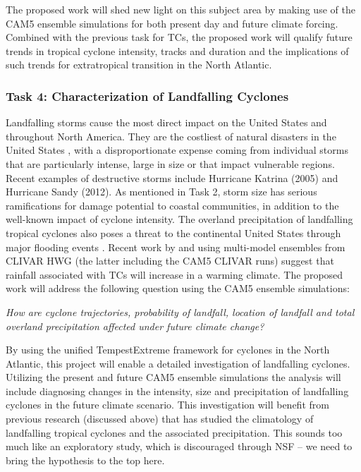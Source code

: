 \documentclass[11pt]{article}
\begin{document}
The proposed work will shed new light on this subject area by making use of the CAM5 ensemble simulations for both present day and future climate forcing. Combined with the previous task for TCs, the proposed work will qualify future trends in tropical cyclone intensity, tracks and duration and the implications of such trends for extratropical transition in the North Atlantic.

\subsubsection{Task 4: Characterization of Landfalling Cyclones}

Landfalling storms cause the most direct impact on the United States and throughout North America.  They are the costliest of natural disasters in the United States \citep{Pielke1998}, with a disproportionate expense coming from individual storms that are particularly intense, large in size or that impact vulnerable regions. Recent examples of destructive storms include Hurricane Katrina (2005) and Hurricane Sandy (2012). As mentioned in Task 2, storm size has serious ramifications for damage potential to coastal communities, in addition to the well-known impact of cyclone intensity.  The overland precipitation of landfalling tropical cyclones also poses a threat to the continental United States through major flooding events \citep{Villarini2014tcflooding}. Recent work by \citet{Scoccimarro2014} and \cite{Villarini2014} using multi-model ensembles from CLIVAR HWG (the latter including the CAM5 CLIVAR runs) suggest that rainfall associated with TCs will increase in a warming climate. The proposed work will address the following question using the CAM5 ensemble simulations:

\emph{How are cyclone trajectories, probability of landfall, location of landfall and total overland precipitation affected under future climate change?}

By using the unified TempestExtreme framework for cyclones in the North Atlantic, this project will enable a detailed investigation of landfalling cyclones.  Utilizing the present and future CAM5 ensemble simulations the analysis will include diagnosing changes in the intensity, size and precipitation of landfalling cyclones in the future climate scenario.  This investigation will benefit from previous research (discussed above) that has studied the climatology of landfalling tropical cyclones and the associated precipitation. {\color{red}This sounds too much like an exploratory study, which is discouraged through NSF -- we need to bring the hypothesis to the top here.}
\end{document}
